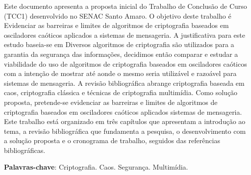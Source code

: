 \documentclass[
    12pt,                %
    openright,           %
    oneside,             %
    a4paper,             %
    english,             %
    brazil               %
]{abntex2}
\begin{document}

\frenchspacing

\pretextual

\imprimircapa

\imprimirfolhaderosto

\begin{resumo}
Este documento apresenta a proposta inicial do Trabalho de Conclusão de Curso (TCC1) desenvolvido no SENAC Santo Amaro. 
O objetivo deste trabalho é Evidenciar as barreiras e limites de algoritmos de criptografia baseados em osciladores caóticos aplicados a sistemas de mensageria. 
A justificativa para este estudo baseia-se em Diversos algoritmos de criptografia são utilizados para a garantia da segurança das informações, 
decidimos então comparar e estudar a viabilidade do uso de algoritmos de criptografia baseados em osciladores caóticos
 com a intenção de mostrar até aonde o mesmo seria utilizável e razoável para sistemas de mensageria. 
 A revisão bibliográfica abrange criptografia baseada em caos, criptografia clássica e técnicas de criptografia multimídia. 
 Como solução proposta, pretende-se evidenciar as barreiras e limites de algoritmos de criptografia baseados em osciladores caóticos aplicados sistemas de mensageria. 
 Este trabalho está organizado em três capítulos que apresentam a introdução ao tema,
  a revisão bibliográfica que fundamenta a pesquisa, o desenvolvimento com a solução proposta e o cronograma de trabalho, seguidos das referências bibliográficas.

\vspace{\onelineskip}

\noindent
\textbf{Palavras-chave}: Criptografia. Caos. Segurança. Multimídia.
\end{resumo}

\end{document}

